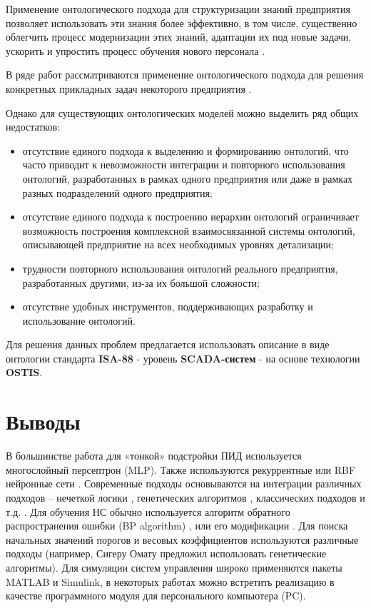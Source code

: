 Применение онтологического подхода для структуризации знаний предприятия позволяет использовать эти знания более эффективно, в том числе, существенно облегчить процесс модернизации этих знаний, адаптации их под новые задачи, ускорить и упростить процесс обучения нового персонала \cite{Гладун2006}.

В ряде работ рассматриваются применение онтологического подхода для решения конкретных прикладных задач некоторого предприятия \cite{Загорулько2012}.

Однако для существующих онтологических моделей можно выделить ряд общих недостатков:

\begin{itemize}
    \item отсутствие единого подхода к выделению и формированию онтологий, что часто приводит к невозможности интеграции и повторного использования онтологий, разработанных в рамках одного предприятия или даже в рамках разных подразделений одного предприятия;
    \item отсутствие единого подхода к построению иерархии онтологий ограничивает возможность построения комплексной взаимосвязанной системы онтологий, описывающей предприятие на всех необходимых уровнях детализации;
    \item трудности повторного использования онтологий реального предприятия, разработанных другими, из-за их большой сложности;
    \item отсутствие удобных инструментов, поддерживающих разработку и использование онтологий.
\end{itemize}

Для решения данных проблем предлагается использовать описание в виде онтологии стандарта \textbf{ISA-88} - уровень \textbf{SCADA-систем} - на основе технологии \textbf{OSTIS}.

\section{Выводы}

В большинстве работа для «тонкой» подстройки ПИД используется многослойный персептрон (MLP). Также используются рекуррентные или RBF нейронные сети \cite{Reza2011}. Современные подходы основываются на интеграции различных подходов – нечеткой логики \cite{Tahour2007}, генетических алгоритмов \cite{Sharkawy2006}, классических подходов и т.д. \cite{Omatu_Khalid_Yusof}.
Для обучения НС обычно используется алгоритм обратного распространения ошибки (BP algorithm) \cite{Omatu_Khalid_Yusof}, \cite{Ruano1992ApplicationsON} или его модификации \cite{Han1999}. Для поиска начальных значений порогов и весовых коэффициентов используются различные подходы (например, Сигеру Омату \cite{Omatu_Khalid_Yusof} предложил использовать генетические алгоритмы). Для симуляции систем управления широко применяются пакеты MATLAB и Simulink, в некоторых работах можно встретить реализацию в качестве программного модуля для персонального компьютера (PC).


